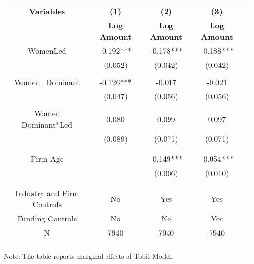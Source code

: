  \begin{table}[htbp]
    \begin{tabular}{c c c c c}
    \toprule
    \textbf{Variables} & \textbf{(1)} & \textbf{(2)} & \textbf{(3)}               \\ 
    \textbf & \textbf{Log Amount} & \textbf{Log Amount} & \textbf{Log Amount}  \\ 

    \midrule
    WomenLed         &   -0.192*** &      -0.178***  &        -0.188***   \\
                        &    (0.052)  &      (0.042)   &         (0.042)  \\
                        &             &                &                  \\
    Women$-$Dominant    &    -0.126*** &      -0.017    &        -0.021  \\
                        &    (0.047)  &      (0.056)   &         (0.056)  \\
                        &             &                &                    \\
    Women Dominant*Led      &    0.080     &      0.099  &        0.097   \\
                        &   (0.089)   &      (0.071)   &      (0.071)  \\                    
                        &             &                &             \\
                        &             &                &                    \\
    Firm Age            &             &      -0.149*** &    -0.054***        \\
                        &             &      (0.006)   &    (0.010)       \\
                        &             &                &                 \\
                        &             &                &                \\
Industry and Firm Controls   &   No        &   Yes       &        Yes    \\
    Funding Controls    &   No             &   No        &         Yes        \\

    \midrule
     N                  &   7940          &      7940  &     7940        \\          
    \bottomrule
    \addlinespace[1ex]
    \multicolumn{3}{l}{\textsuperscript{***}$P<0.01$, 
      \textsuperscript{**}$P<0.05$, 
      \textsuperscript{*}$P<0.1$}
    \end{tabular}
    \newline
    Note: The table reports marginal effects of Tobit Model.
\end{table}
